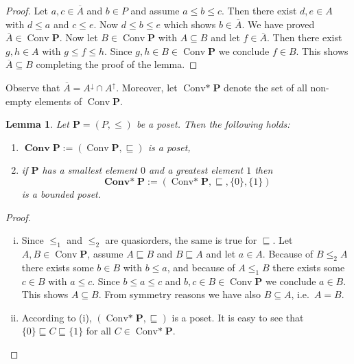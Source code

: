 \documentclass[12pt]{article}
\DeclareMathOperator{\Conv}{Conv}
\DeclareMathOperator{\Convs}{Conv*}
\DeclareMathOperator{\BConv}{\mathbf{Conv}}
\DeclareMathOperator{\BConvs}{\mathbf{Conv*}}
\newtheorem{lemma}[theorem]{Lemma}
\begin{document}
\begin{proof}
Let $a,c\in\overline A$ and $b\in P$ and assume $a\le b\le c$. Then there exist $d,e\in A$ with $d\le a$ and $c\le e$. Now $d\le b\le e$ which shows $b\in\overline A$. We have proved $\overline A\in\Conv\mathbf P$. Now let $B\in\Conv\mathbf P$ with $A\subseteq B$ and let $f\in\overline A$. Then there exist $g,h\in A$ with $g\le f\le h$. Since $g,h\in B\in\Conv\mathbf P$ we conclude $f\in B$. This shows $\overline A\subseteq B$ completing the proof of the lemma.
\end{proof}

Observe that $\overline A=A^\downarrow\cap A^\uparrow$. Moreover, let $\Convs\mathbf P$ denote the set of all non-empty elements of $\Conv\mathbf P$.

\begin{lemma}\label{lem2}
Let $\mathbf P=(P,\le)$ be a poset. Then the following holds:
\begin{enumerate}[{\rm(i)}]
\item $\BConv\mathbf P:=(\Conv\mathbf P,\sqsubseteq)$ is a poset,
\item if $\mathbf P$ has a smallest element $0$ and a greatest element $1$ then
\[
\BConvs\mathbf P:=(\Convs\mathbf P,\sqsubseteq,\{0\},\{1\})
\]
is a bounded poset.
\end{enumerate}
\end{lemma}

\begin{proof}
\
\begin{enumerate}[(i)]
\item Since $\le_1$ and $\le_2$ are quasiorders, the same is true for $\sqsubseteq$. Let $A,B\in\Conv\mathbf P$, assume $A\sqsubseteq B$ and $B\sqsubseteq A$ and let $a\in A$. Because of $B\le_2A$ there exists some $b\in B$ with $b\le a$, and because of $A\le_1B$ there exists some $c\in B$ with $a\le c$. Since $b\le a\le c$ and $b,c\in B\in\Conv\mathbf P$ we conclude $a\in B$. This shows $A\subseteq B$. From symmetry reasons we have also $B\subseteq A$, i.e.\ $A=B$.
\item According to (i), $(\Convs\mathbf P,\sqsubseteq)$ is a poset. It is easy to see that $\{0\}\sqsubseteq C\sqsubseteq\{1\}$ for all $C\in\Convs\mathbf P$.
\end{enumerate}
\end{proof}
\end{document}
